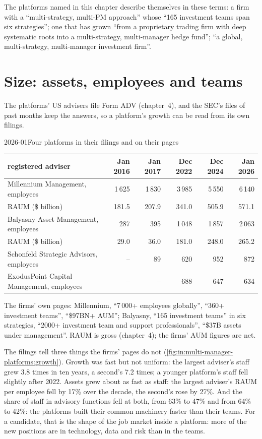 The platforms named in this chapter describe themselves in these terms: a firm with a ``multi-strategy, multi-PM
approach'' whose ``165 investment teams span six strategies''; one that has grown ``from a proprietary trading firm with
deep systematic roots into a multi-strategy, multi-manager hedge fund''; ``a global, multi-strategy, multi-manager
investment firm''.

\section{Size: assets, employees and teams}

The platforms' US advisers file Form ADV (chapter~4), and the SEC's files of past months keep the answers, so a platform's
growth can be read from its own filings.

\begin{dated}{2026-01}{Four platforms in their filings and on their pages}\label{dat:in:multi-manager-platforms:size}
\footnotesize
\begin{tabular}{@{}lrrrrr@{}}
\toprule
registered adviser & Jan 2016 & Jan 2017 & Dec 2022 & Dec 2024 & Jan 2026\\
\midrule
Millennium Management, employees & 1\,625 & 1\,830 & 3\,985 & 5\,550 & 6\,140\\
\quad RAUM (\$ billion) & 181.5 & 207.9 & 341.0 & 505.9 & 571.1\\
Balyasny Asset Management, employees & 287 & 395 & 1\,048 & 1\,857 & 2\,063\\
\quad RAUM (\$ billion) & 29.0 & 36.0 & 181.0 & 248.0 & 265.2\\
Schonfeld Strategic Advisors, employees & -- & 89 & 620 & 952 & 872\\
ExodusPoint Capital Management, employees & -- & -- & 688 & 647 & 634\\
\bottomrule
\end{tabular}

\smallskip\noindent The firms' own pages: Millennium, ``7\,000+ employees globally'', ``360+ investment teams'', ``\$97BN+
AUM''; Balyasny, ``165 investment teams'' in six strategies, ``2000+ investment team and support professionals'',
``\$37B assets under management''. RAUM is gross (chapter~4); the firms' AUM figures are net.
\end{dated}

The filings tell three things the firms' pages do not
(\cref{fig:in:multi-manager-platforms:growth}). Growth was fast but not uniform: the largest adviser's staff grew 3.8
times in ten years, a second's 7.2 times; a younger platform's staff fell slightly after 2022. Assets grew about as fast
as staff: the largest adviser's RAUM per employee fell by 17\% over the decade, the second's rose by 27\%. And the share of
staff in advisory functions fell at both, from 63\% to 47\% and from 64\% to 42\%: the platforms built their common
machinery faster than their teams. For a candidate, that is the shape of the job market inside a platform: more of
the new positions are in technology, data and risk than in the teams.

